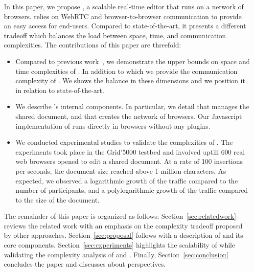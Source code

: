 In this paper, we propose \CRATE, a scalable real-time editor that runs on a
network of browsers. \CRATE relies on WebRTC and browser-to-browser
communication to provide an easy access for end-users. Compared to
state-of-the-art, it presents a different tradeoff which balances the load
between space, time, and communication complexities. The contributions of this
paper are threefold:
\begin{itemize}
\item Compared to previous work~\cite{nedelec2013lseq}, we demonstrate the upper
  bounds on space and time complexities of \LSEQ. In addition to which we
  provide the communication complexity of \CRATE. We shows the balance in these
  dimensions and we position it in relation to state-of-the-art.
\item We describe \CRATE's internal components. In particular, we detail \LSEQ
  that manages the shared document, and \SPRAY that creates the network of
  browsers. Our Javascript implementation of \CRATE runs directly in browsers
  without any plugins.
\item We conducted experimental studies to validate the complexities of
  \CRATE. The experiments took place in the Grid'5000 testbed and involved
  uptill $600$ real web browsers opened to edit a shared document. At a rate of
  100 insertions per seconds, the document size reached above 1 million
  characters. As expected, we observed a logarithmic growth of the traffic
  compared to the number of participants, and a polylogarithmic growth of the
  traffic compared to the size of the document.
\end{itemize}

The remainder of this paper is organized as follows:
Section~\ref{sec:relatedwork} reviews the related work with an emphasis on the
complexity tradeoff proposed by other approaches. Section~\ref{sec:proposal}
follows with a description of \CRATE and its core
components. Section~\ref{sec:experiments} highlights the scalability of \CRATE
while validating the complexity analysis of \LSEQ and \SPRAY. Finally,
Section~\ref{sec:conclusion} concludes the paper and discusses about
perspectives.

